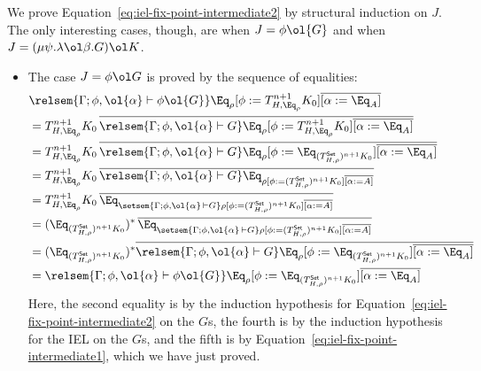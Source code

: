 \documentclass{lmcs}
\theoremstyle{plain}\newtheorem{satz}[thm]{Satz}
\newcommand{\set}{\mathsf{Set}}
\begin{document}
\begin{itemize}
We prove Equation~\ref{eq:iel-fix-point-intermediate2} by structural
induction on $J$. The only interesting cases, though, are when $J =
\phi \ol{G}$ and when $J = (\mu \psi.\lambda \ol\beta. G)\ol K$.
\begin{itemize}
\item The case $J = \phi \ol G$ is proved by the sequence of equalities:
\[
\begin{split}
& \relsem{\Gamma; \phi, \ol{\alpha} \vdash \phi
    \ol{G}} \Eq_{\rho} [\phi := T^{n+1}_{H,\Eq_{\rho}} K_0]
  \overline{[\alpha := \Eq_A]}
  \\
&= T^{n+1}_{H,\Eq_{\rho}} K_0\, \overline{\relsem{\Gamma; 
      \phi, \ol{\alpha} \vdash G} \Eq_{\rho} [\phi :=
      T^{n+1}_{H,\Eq_{\rho}} K_0] \overline{[\alpha :=
        \Eq_A]}} \\ 
&= T^{n+1}_{H,\Eq_{\rho}} K_0\, \overline{\relsem{\Gamma; 
      \phi, \ol{\alpha} \vdash G} \Eq_{\rho} [\phi :=
      \Eq_{(T^\set_{H,\rho})^{n+1} K_0}] \overline{[\alpha :=
        \Eq_A]}} \\ 
&= T^{n+1}_{H,\Eq_{\rho}} K_0\, \overline{\relsem{\Gamma; 
      \phi, \ol{\alpha} \vdash G} \Eq_{\rho [\phi := (T^\set_{H,\rho})^{n+1}
        K_0] \overline{[\alpha := A]}}} \\ 
&= T^{n+1}_{H,\Eq_{\rho}} K_0\, \overline{\Eq_{\setsem{\Gamma;
        \phi, \ol{\alpha} \,\vdash G} \rho [\phi :=
        (T^\set_{H,\rho})^{n+1} K_0] \overline{[\alpha :=
          A]}}} \\ 
&= (\Eq_{(T^\set_{H,\rho})^{n+1} K_0})^* \,\overline{\Eq_{\setsem{\Gamma;
        \phi, \ol{\alpha} \,\vdash G} \rho [\phi :=
        (T^\set_{H,\rho})^{n+1} K_0] \overline{[\alpha :=
          A]}}} \\ 
&= (\Eq_{(T^\set_{H,\rho})^{n+1} K_0})^* \overline{\relsem{\Gamma;
      \phi, \ol{\alpha} \vdash G} \Eq_{\rho} [\phi :=
      \Eq_{(T^\set_{H,\rho})^{n+1} K_0}] \overline{[\alpha :=
        \Eq_A]}} \\ 
&= \relsem{\Gamma; \phi, \ol{\alpha} \vdash \phi \ol{G}}
  \Eq_{\rho} [\phi := \Eq_{(T^\set_{H,\rho})^{n+1} K_0}]
  \overline{[\alpha := \Eq_A]} 
\end{split}
\]
Here, the second equality is by the induction hypothesis for
Equation~\ref{eq:iel-fix-point-intermediate2} on the $G$s, the fourth
is by the induction hypothesis for the IEL on the $G$s, and the fifth
is by Equation~\ref{eq:iel-fix-point-intermediate1}, which we have
just proved.


\end{itemize}
\end{itemize}
\end{document}
